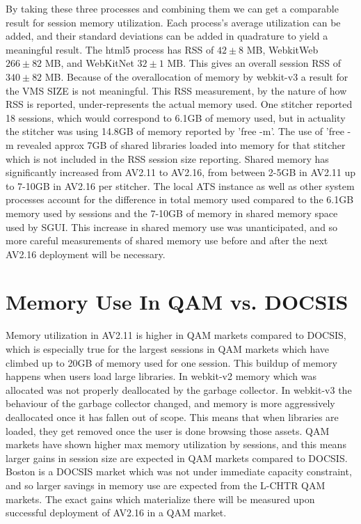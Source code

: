 \documentclass{article}
\begin{document}
By taking these three processes and combining them we can get a comparable result for session memory utilization. Each process's average utilization can be added, and their standard deviations can be added in quadrature to yield a meaningful result. The html5 process has RSS of $42 \pm 8$ MB, WebkitWeb $266 \pm 82$ MB, and WebKitNet $32 \pm 1$ MB. This gives an overall session RSS of $340 \pm 82$ MB. Because of the overallocation of memory by webkit-v3 a result for the VMS SIZE is not meaningful. This RSS measurement, by the nature of how RSS is reported, under-represents the actual memory used. One stitcher reported 18 sessions, which would correspond to 6.1GB of memory used, but in actuality the stitcher was using 14.8GB of memory reported by 'free -m'. The use of 'free -m revealed approx 7GB of shared libraries loaded into memory for that stitcher which is not included in the RSS session size reporting. Shared memory has significantly increased from AV2.11 to AV2.16, from between 2-5GB in AV2.11 up to 7-10GB in AV2.16 per stitcher. The local ATS instance as well as other system processes account for the difference in total memory used compared to the 6.1GB memory used by sessions and the 7-10GB of memory in shared memory space used by SGUI. This increase in shared memory use was unanticipated, and so more careful measurements of shared memory use before and after the next AV2.16 deployment will be necessary. 



\section{Memory Use In QAM vs. DOCSIS}
\label{SECTION-QAMDOCSIS}

Memory utilization in AV2.11 is higher in QAM markets compared to DOCSIS, which is especially true for the largest sessions in QAM markets which have climbed up to 20GB of memory used for one session. This buildup of memory happens when users load large libraries. In webkit-v2 memory which was allocated was not properly deallocated by the garbage collector. In webkit-v3 the behaviour of the garbage collector changed, and memory is more aggressively deallocated once it has fallen out of scope. This means that when libraries are loaded, they get removed once the user is done browsing those assets. QAM markets have shown higher max memory utilization by sessions, and this means larger gains in session size are expected in QAM markets compared to DOCSIS. Boston is a DOCSIS market which was not under immediate capacity constraint, and so larger savings in memory use are expected from the L-CHTR QAM markets. The exact gains which materialize there will be measured upon successful deployment of AV2.16 in a QAM market. 
\end{document}
